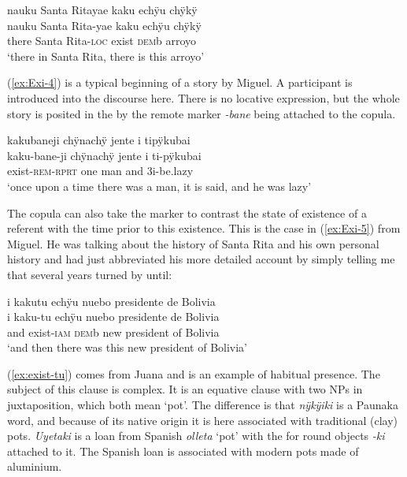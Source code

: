 \ea\label{ex:exist-1}
\begingl 
\glpreamble nauku Santa Ritayae kaku echÿu chÿkÿ\\
\gla nauku {Santa Rita}-yae kaku echÿu chÿkÿ\\ 
\glb there {Santa Rita}-\textsc{loc} exist \textsc{dem}b arroyo\\ 
\glft ‘there in Santa Rita, there is this arroyo’
\trailingcitation{[jxx-a120516l-a.571]}
\xe
{}

(\ref{ex:Exi-4}) is a typical beginning of a story by Miguel. A participant is introduced into the discourse here. There is no locative expression, but the whole story is posited in the  by the remote marker \textit{-bane} being attached to the copula.

\ea\label{ex:Exi-4}
\begingl
\glpreamble kakubaneji chÿnachÿ jente i tipÿkubai\\
\gla kaku-bane-ji chÿnachÿ jente i ti-pÿkubai\\
\glb exist-\textsc{rem}-\textsc{rprt} one man and 3i-be.lazy\\
\glft ‘once upon a time there was a man, it is said, and he was lazy’
\endgl
\trailingcitation{[mox-n110920l.011]}
\xe

The copula can also take the  marker to contrast the state of existence of a referent with the time prior to this existence. This is the case in (\ref{ex:Exi-5}) from Miguel. He was talking about the history of Santa Rita and his own personal history and had just abbreviated his more detailed account by simply telling me that several years turned by until:

\ea\label{ex:Exi-5}
\begingl
\glpreamble i kakutu echÿu nuebo presidente de Bolivia\\
\gla i kaku-tu echÿu {nuebo presidente de Bolivia}\\
\glb and exist-\textsc{iam} \textsc{dem}b {new president of Bolivia}\\
\glft ‘and then there was this new president of Bolivia’
\endgl
\trailingcitation{[mxx-p110825l.035]}
\xe

(\ref{ex:exist-tu}) comes from Juana and is an example of habitual presence. The subject of this clause is complex. It is an equative clause with two NPs in juxtaposition, which both mean ‘pot’. The difference is that \textit{nÿkÿiki} is a Paunaka word, and because of its native origin it is here associated with traditional (clay) pots. \textit{Uyetaki} is a loan from Spanish \textit{olleta} ‘pot’ with the  for round objects \textit{-ki} attached to it. The Spanish loan is associated with modern pots made of aluminium.

